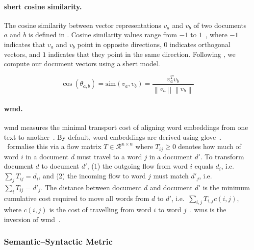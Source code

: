 \paragraph{\acs{sbert} cosine similarity.}
The cosine similarity between vector representations $v_a$ and $v_b$ of two documents $a$ and $b$ is defined in . 
Cosine similarity values range from $-1$ to $1$~\citep{thongtan_cosine_sim_19,zhang_bertscore_2020}, where $-1$ indicates that $v_a$ and $v_b$ point in opposite directions, $0$ indicates orthogonal vectors, and $1$ indicates that they point in the same direction. 
Following \citet{gohsen_captions_2023}, we compute our document vectors using a \ac{sbert} model.

\begin{equation}
    \cos(\theta_{a,b})=\mathrm{sim}(v_a,v_b)=\frac{v_a^Tv_b}{\left\| v_a \right\|\left\| v_b \right\|}
    \label{eq:cosine_sim}
\end{equation}


\paragraph{\ac{wmd}.}
\ac{wmd} measures the minimal transport cost of aligning word embeddings from one text to another~\citep{gohsen_captions_2023}. 
By default, word embeddings are derived using \acs{glove}~\citep{glove_wmd_2014}.
\citet{kusner_wmd_15}\ formalise this via a flow matrix $T \in \mathcal{R}^{n \times n}$ where $T_{ij} \geq 0$ denotes how much of word $i$ in a document $d$ must travel to a word $j$ in a document $d'$.
To transform document $d$ to document $d'$, (1) the outgoing flow from word $i$ equals $d_i$, i.e.\ $\sum_{j}T_{ij}=d_i$, and (2) the incoming flow to word $j$ must match $d'_j$, i.e.\ $\sum_{i}T_{ij}=d'_j$.
The distance between document $d$ and document $d'$ is the minimum cumulative cost required to move all words from $d$ to $d'$, i.e.\ $\sum_{i,j}T_{i,j}c(i,j)$, where $c(i,j)$ is the cost of travelling from word $i$ to word $j$~\citep{kusner_wmd_15}.
\ac{wms} is the inversion of \ac{wmd}~\citep{gohsen_captions_2023}.

\subsubsection{Semantic–Syntactic Metric}

